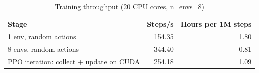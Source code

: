 \begin{table}[t]
\centering
\caption{Training throughput (20 CPU cores, n\_envs=8)}
\label{tab:throughput}
\begin{tabular}{lrr}
\toprule
Stage & Steps/s & Hours per 1M steps \\
\midrule
1 env, random actions & 154.35 & 1.80 \\
8 envs, random actions & 344.40 & 0.81 \\
PPO iteration: collect + update on CUDA & 254.18 & 1.09 \\
\bottomrule
\end{tabular}
\end{table}
